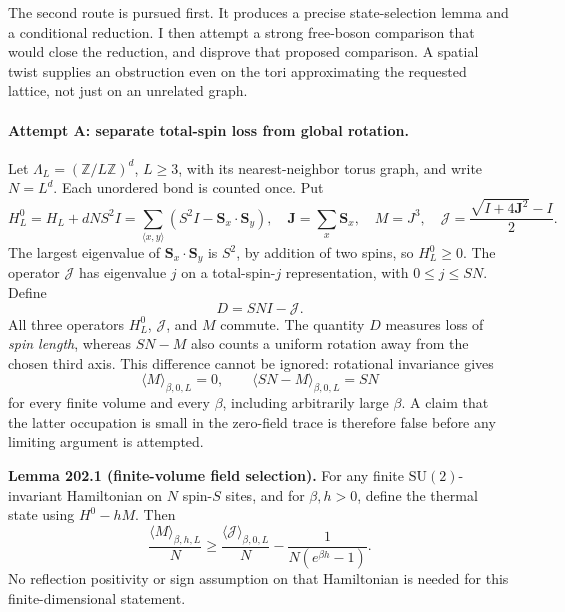 \documentclass[11pt]{article}
\newcommand{\Z}{\mathbb{Z}}
\begin{document}
	The second route is pursued first. It produces a precise state-selection
	lemma and a conditional reduction. I then attempt a strong free-boson
	comparison that would close the reduction, and disprove that proposed
	comparison. A spatial twist supplies an obstruction even on the tori
	approximating the requested lattice, not just on an unrelated graph.
	
	\paragraph{Attempt A: separate total-spin loss from global rotation.}
	Let $\Lambda_L=(\Z/L\Z)^d$, $L\geq3$, with its nearest-neighbor torus
	graph, and write $N=L^d$. Each unordered bond is counted once. Put
	\begin{equation}\label{ra202:operators}
		H^0_L=H_L+dNS^2I
		=\sum_{\langle x,y\rangle}(S^2I-\mathbf S_x\cdot\mathbf S_y),
		\quad \mathbf J=\sum_x\mathbf S_x,\quad M=J^3,
		\quad \mathcal J=\frac{\sqrt{I+4\mathbf J^2}-I}{2}.
	\end{equation}
	The largest eigenvalue of $\mathbf S_x\cdot\mathbf S_y$ is $S^2$,
	by addition of two spins, so $H^0_L\geq0$. The operator $\mathcal J$
	has eigenvalue $j$ on a total-spin-$j$ representation, with
	$0\leq j\leq SN$. Define
	\[
	D=SN I-\mathcal J.
	\]
	All three operators $H^0_L$, $\mathcal J$, and $M$ commute. The
	quantity $D$ measures loss of \emph{spin length}, whereas $SN-M$ also
	counts a uniform rotation away from the chosen third axis. This
	difference cannot be ignored: rotational invariance gives
	\begin{equation}\label{ra202:zeromode}
		\langle M\rangle_{\beta,0,L}=0,
		\qquad \langle SN-M\rangle_{\beta,0,L}=SN
	\end{equation}
	for every finite volume and every $\beta$, including arbitrarily large
	$\beta$. A claim that the latter occupation is small in the zero-field
	trace is therefore false before any limiting argument is attempted.
	
	\textbf{Lemma 202.1 (finite-volume field selection).}
	For any finite $\mathrm{SU}(2)$-invariant Hamiltonian on $N$ spin-$S$
	sites, and for $\beta,h>0$, define the thermal state using
	$H^0-hM$. Then
	\begin{equation}\label{ra202:selection}
		\frac{\langle M\rangle_{\beta,h,L}}{N}
		\geq \frac{\langle\mathcal J\rangle_{\beta,0,L}}{N}
		-\frac{1}{N(e^{\beta h}-1)}.
	\end{equation}
	No reflection positivity or sign assumption on that Hamiltonian is
	needed for this finite-dimensional statement.
	
\end{document}
